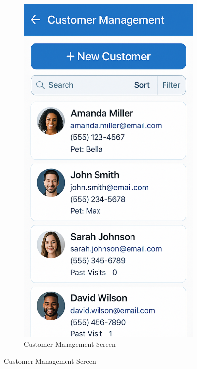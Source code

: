 \documentclass[12pt,a4paper,twoside]{book}
\begin{document}
\begin{figure}[H]
    \centering
    \begin{subfigure}[b]{0.48\textwidth}
        \centering
        \includegraphics[width=\textwidth,height=0.4\textheight,keepaspectratio]{Mockup Screens/customer_management.png}
        \caption{Customer Management Screen}\label{fig:mockup3}

\end{subfigure}
\end{figure}
\end{document}

